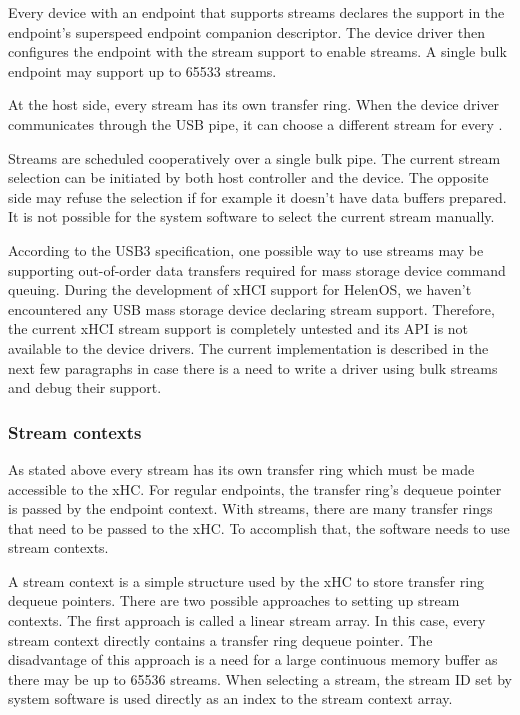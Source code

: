 Every device with an endpoint that supports streams declares the support in the
endpoint's superspeed endpoint companion descriptor. The device driver then
configures the endpoint with the stream support to enable streams. A single
bulk endpoint may support up to 65533 streams.

At the host side, every stream has its own transfer ring. When the device
driver communicates through the USB pipe, it can choose a different stream for
every .

Streams are scheduled cooperatively over a single bulk pipe. The current stream
selection can be initiated by both host controller and the device. The opposite
side may refuse the selection if for example it doesn't have data buffers
prepared. It is not possible for the system software to select the current
stream manually.

According to the USB3 specification, one possible way to use streams may be
supporting out-of-order data transfers required for mass storage device command
queuing. During the development of xHCI support for HelenOS, we haven't
encountered any USB mass storage device declaring stream support. Therefore,
the current xHCI stream support is completely untested and its API is not
available to the device drivers. The current implementation is described in the
next few paragraphs in case there is a need to write a driver using bulk
streams and debug their support.

\subsubsection{Stream contexts}

As stated above every stream has its own transfer ring which must be made
accessible to the xHC. For regular endpoints, the transfer ring's dequeue
pointer is passed by the endpoint context. With streams, there are many
transfer rings that need to be passed to the xHC. To accomplish that, the
software needs to use stream contexts.

A stream context is a simple structure used by the xHC to store transfer ring
dequeue pointers. There are two possible approaches to setting up stream
contexts. The first approach is called a linear stream array. In this case,
every stream context directly contains a transfer ring dequeue pointer. The
disadvantage of this approach is a need for a large continuous memory buffer as
there may be up to 65536 streams. When selecting a stream, the stream ID set by
system software is used directly as an index to the stream context array.

